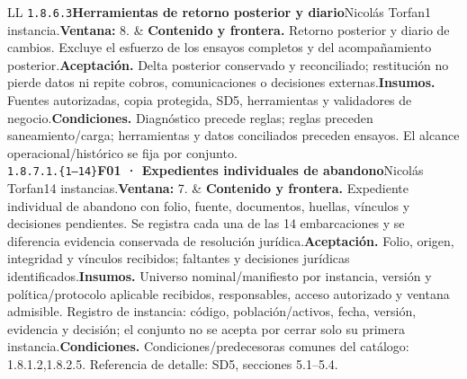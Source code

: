 \begin{longtable}{L{\tabcolsep\relax}L{\tabcolsep\relax}}
\texttt{1.\allowbreak{}8.\allowbreak{}6.\allowbreak{}3}\newline{}\textbf{Herramientas de retorno posterior y diario}\newline{}Nicolás Torfan\newline{}1 instancia.\newline{}\textbf{Ventana:} 8. & \textbf{Contenido y frontera.} Retorno posterior y diario de cambios. Excluye el esfuerzo de los ensayos completos y del acompañamiento posterior.\newline{}\textbf{Aceptación.} Delta posterior conservado y reconciliado; restitución no pierde datos ni repite cobros, comunicaciones o decisiones externas.\newline{}\textbf{Insumos.} Fuentes autorizadas, copia protegida, SD5, herramientas y validadores de negocio.\newline{}\textbf{Condiciones.} Diagnóstico precede reglas; reglas preceden saneamiento/carga; herramientas y datos conciliados preceden ensayos. El alcance operacional/histórico se fija por conjunto.\\\hline
\texttt{1.\allowbreak{}8.\allowbreak{}7.\allowbreak{}1.\allowbreak{}\{1--14\}}\newline{}\textbf{F01 · Expedientes individuales de abandono}\newline{}Nicolás Torfan\newline{}14 instancias.\newline{}\textbf{Ventana:} 7. & \textbf{Contenido y frontera.} Expediente individual de abandono con folio, fuente, documentos, huellas, vínculos y decisiones pendientes. Se registra cada una de las 14 embarcaciones y se diferencia evidencia conservada de resolución jurídica.\newline{}\textbf{Aceptación.} Folio, origen, integridad y vínculos recibidos; faltantes y decisiones jurídicas identificados.\newline{}\textbf{Insumos.} Universo nominal/manifiesto por instancia, versión y política/protocolo aplicable recibidos, responsables, acceso autorizado y ventana admisible. Registro de instancia: código, población/activos, fecha, versión, evidencia y decisión; el conjunto no se acepta por cerrar solo su primera instancia.\newline{}\textbf{Condiciones.} Condiciones/predecesoras comunes del catálogo: 1.8.1.2,1.8.2.5. Referencia de detalle: SD5, secciones 5.1--5.4.\\\hline

\end{longtable}
